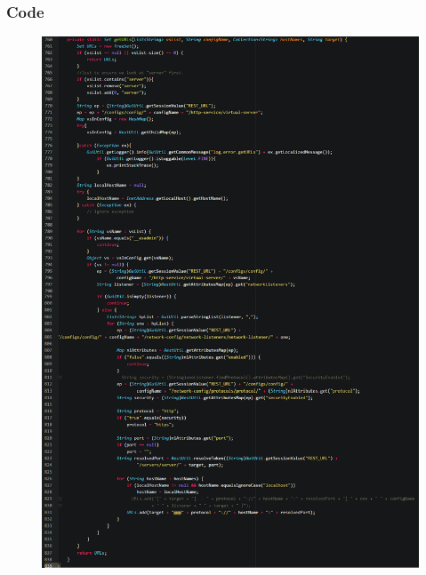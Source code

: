 			\subsubsection{Code}
			\begin{figure}[h!]
				\includegraphics[width=\textwidth]{../SE2_CODE/getURLs}
			\end{figure}
